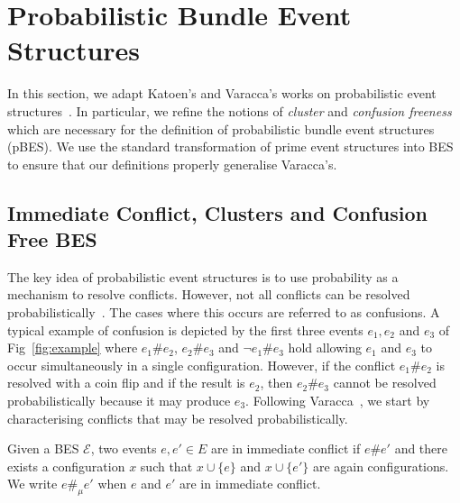 \documentclass{llncs}
\newcommand{\EE}{\mathcal{E}}
\newcommand{\<}{\langle}
\renewcommand{\>}{\rangle}
\begin{document}
\section{Probabilistic Bundle Event Structures}\label{pBES}

In this section, we adapt Katoen's and Varacca's works on probabilistic event structures~\cite{Kat96,Var03}. In particular, we refine the notions of \emph{cluster} and \emph{confusion freeness} which are necessary for the definition of probabilistic bundle event structures (pBES). We use the standard transformation of prime event structures into BES to ensure that our definitions properly generalise Varacca's.

\subsection{Immediate Conflict, Clusters and Confusion Free BES}

The key idea of probabilistic event structures is to use probability as a mechanism to resolve conflicts. However, not all conflicts can be resolved probabilistically~\cite{Kat96}. The cases where this occurs are referred to as confusions. A typical example of confusion is depicted by the first three events $e_1,e_2$ and $e_3$ of Fig~\ref{fig:example} where $e_1\#e_2$, $e_2\#e_3$ and $\neg e_1\#e_3$ hold allowing $e_1$ and $e_3$ to occur simultaneously in a single configuration. However, if the conflict $e_1\# e_2$ is resolved with a coin flip and if the result is $e_2$, then $e_2\# e_3$ cannot be resolved probabilistically because it may produce $e_3$. Following Varacca~\cite{Var03}, we start by characterising conflicts that may be resolved probabilistically.

\begin{definition}\label{def:immediate-conflict} 
Given a BES $\EE$, two events $e,e'\in E$ are in immediate conflict if $e\# e'$ and there exists a configuration $x$ such that $x\cup\{e\}$ and $x\cup\{e'\}$ are again configurations. We write $e\#_\mu e'$ when $e$ and $e'$ are in immediate conflict.
\end{definition}
\end{document}
